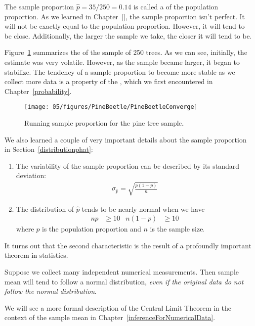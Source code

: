 The sample proportion $\hat{p} = 35 / 250 = 0.14$ is called a  of the population proportion. As we learned in Chapter~\ref{}, the sample proportion isn't perfect. It will not be exactly equal to the population proportion. However, it will tend to be close. Additionally, the larger the sample we take, the closer it will tend to be.

Figure~\ref{PineBeetleConverge} summarizes the  of the sample of 250 trees. As we can see, initially, the estimate was very volatile. However, as the sample became larger, it began to stabilize. The tendency of a sample proportion to become more stable as we collect more data is a property of the , which we first encountered in Chapter~\ref{probability}.

\begin{figure}
\centering
\texttt{[image: 05/figures/PineBeetle/PineBeetleConverge]}
\caption{Running sample proportion for the pine tree sample.}
\label{PineBeetleConverge}
\end{figure}

We also learned a couple of very important details about the sample proportion in Section~\ref{distributionphat}:
\begin{enumerate}
\setlength{\itemsep}{0mm}
\item The variability of the sample proportion can be described by its standard deviation:
\begin{align*}
\sigma_{\hat{p}} = \sqrt{\frac{p(1-p)}{n}}
\end{align*}
\item The distribution of $\hat{p}$ tends to be nearly normal when we have
\begin{align*}
np &\geq 10
	& n(1-p) &\geq 10
\end{align*}
where $p$ is the population proportion and $n$ is the sample size.
\end{enumerate}
It turns out that the second characteristic is the result of a profoundly important theorem in statistics.

\begin{termBox}{
Suppose we collect many independent numerical measurements. Then sample mean will tend to follow a normal distribution, \emph{even if the original data do not follow the normal distribution}.\vspace{3mm}

We will see a more formal description of the Central Limit Theorem in the context of the sample mean in Chapter~\ref{inferenceForNumericalData}.}
\end{termBox}

